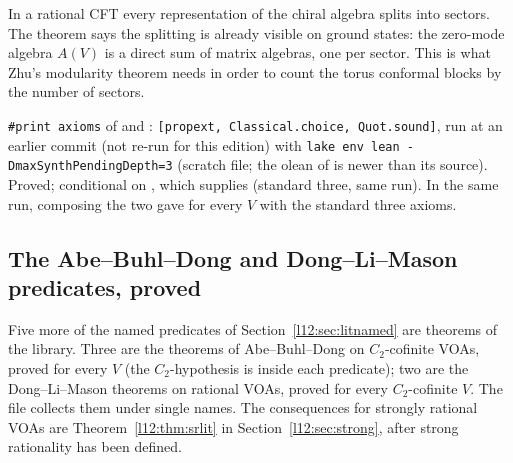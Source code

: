 \begin{physics}
In a rational CFT every representation of the chiral algebra splits into sectors. The theorem says the splitting is
already visible on ground states: the zero-mode algebra $A(V)$ is a direct sum of matrix algebras, one per sector. This is
what Zhu's modularity theorem needs in order to count the torus conformal blocks by the number of sectors.
\end{physics}

\begin{status}
\texttt{\#print axioms} of \allowbreak{}\allowbreak{}\allowbreak{} and
\allowbreak{}: \texttt{[propext, Classical.choice, Quot.sound]}, run
at an earlier commit (not re-run for this edition) with \texttt{lake env lean -DmaxSynthPendingDepth=3} (scratch file; the olean of
 is newer than its source). Proved; conditional on , which 
supplies (standard three, same run). In the same run, composing the two gave  for every $V$ with
the standard three axioms.
\end{status}

\subsection{The Abe--Buhl--Dong and Dong--Li--Mason predicates, proved}\label{l12:sec:litproved}

Five more of the named predicates of Section~\ref{l12:sec:litnamed} are theorems of the library. Three are the theorems of
Abe--Buhl--Dong on $C_2$-cofinite VOAs, proved for every $V$ (the $C_2$-hypothesis is inside each predicate); two are the
Dong--Li--Mason theorems on rational VOAs, proved for every $C_2$-cofinite $V$. The file
 collects them under single
names. The consequences for strongly rational VOAs are Theorem~\ref{l12:thm:srlit} in Section~\ref{l12:sec:strong}, after
strong rationality has been defined.

